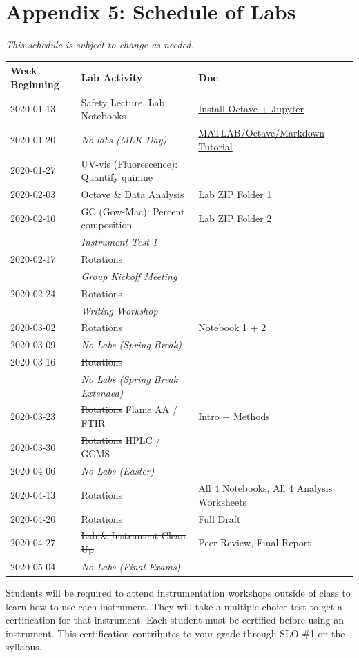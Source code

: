 \documentclass[]{tufte-book}
\begin{document}
\hypertarget{appendix-5-schedule-of-labs}{%
\chapter*{Appendix 5: Schedule of Labs}\label{appendix-5-schedule-of-labs}}

\emph{This schedule is subject to change as needed.}

\begin{longtable}[]{@{}lll@{}}
\toprule
Week Beginning & Lab Activity & Due\tabularnewline
\midrule
\endhead
2020-01-13 & Safety Lecture, Lab Notebooks & \href{\%7B\%7Bsite.baseurl\%7D\%7D/devel/chem370/lab-manual/appendix-1-getting-started-in-octave-and-jupyter-lab.html}{Install Octave + Jupyter}\tabularnewline
2020-01-20 & \emph{No labs (MLK Day)} & \href{\%7B\%7Bsite.baseurl\%7D\%7D/devel/chem370/assignments/matlab-tutorial}{MATLAB/Octave/Markdown Tutorial}\tabularnewline
2020-01-27 & UV-vis (Fluorescence): Quantify quinine &\tabularnewline
2020-02-03 & Octave \& Data Analysis & \href{\%7B\%7Bsite.baseurl\%7D\%7D/devel/chem370/lab-manual/uv-visible-spectroscopy.html}{Lab ZIP Folder 1}\tabularnewline
2020-02-10 & GC (Gow-Mac): Percent composition & \href{\%7B\%7Bsite.baseurl\%7D\%7D/devel/chem370/lab-manual/gas-chromatography-with-thermal-conductivity-detection-gc-tcd.html}{Lab ZIP Folder 2}\tabularnewline
& \emph{Instrument Test 1} &\tabularnewline
2020-02-17 & Rotations &\tabularnewline
& \emph{Group Kickoff Meeting} &\tabularnewline
2020-02-24 & Rotations &\tabularnewline
& \emph{Writing Workshop} &\tabularnewline
2020-03-02 & Rotations & Notebook 1 + 2\tabularnewline
2020-03-09 & \emph{No Labs (Spring Break)} &\tabularnewline
2020-03-16 & \sout{Rotations} &\tabularnewline
& \emph{No Labs (Spring Break Extended)} &\tabularnewline
2020-03-23 & \sout{Rotations} Flame AA / FTIR & Intro + Methods\tabularnewline
2020-03-30 & \sout{Rotations} HPLC / GCMS &\tabularnewline
2020-04-06 & \emph{No Labs (Easter)} &\tabularnewline
2020-04-13 & \sout{Rotations} & All 4 Notebooks, All 4 Analysis Worksheets\tabularnewline
2020-04-20 & \sout{Rotations} & Full Draft\tabularnewline
2020-04-27 & \sout{Lab \& Instrument Clean Up} & Peer Review, Final Report\tabularnewline
2020-05-04 & \emph{No Labs (Final Exams)} &\tabularnewline
\bottomrule
\end{longtable}

Students will be required to attend instrumentation workshops outside of class to learn how to use each instrument. They will take a multiple-choice test to get a certification for that instrument. Each student must be certified before using an instrument. This certification contributes to your grade through SLO \#1 on the syllabus.
\end{document}
